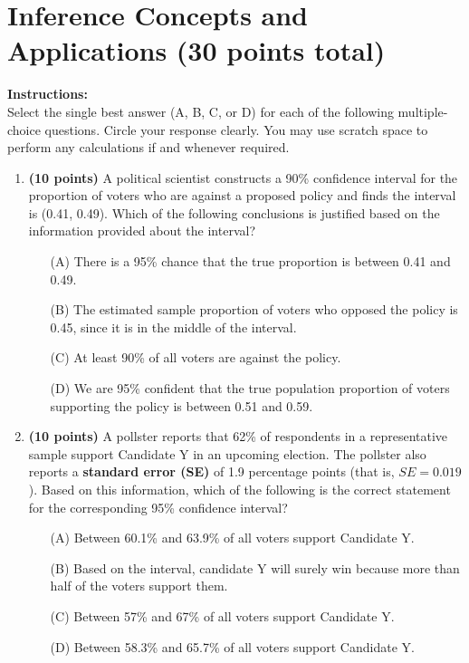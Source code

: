 \documentclass{article}
\newcommand{\blankbox}[2][3cm]{%
    \vspace{-0.5em}
    \begin{figure}[H]
        \makebox[\linewidth]{%
            \begin{tcolorbox}[
                colback=white,
                colframe=white,  %
                width=#2, %
                height=#1,
                boxrule=0.2mm
            ]
            \end{tcolorbox}
        }
    \end{figure}
    \vspace{-2em}
}
\begin{document}
\newpage
\section{Inference Concepts and Applications (30 points total)}
\noindent\textbf{Instructions:} \\
Select the single best answer (A, B, C, or D) for each of the following multiple-choice questions. Circle your response clearly. You may use scratch space to perform any calculations if and whenever required.

\begin{enumerate}
    \item \textbf{(10 points)}   A political scientist constructs a 90\% confidence interval for the proportion of voters who are against a proposed policy and finds the interval is (0.41, 0.49). Which of the following conclusions is justified based on the information provided about the interval?
    \begin{enumerate}
        \item[(A)] There is a 95\% chance that the true proportion is between 0.41 and 0.49.
        \item[(B)] The estimated sample proportion of voters who opposed the policy is 0.45, since it is in the middle of the interval.
        \item[(C)] At least 90\% of all voters are against the policy.
        \item[(D)]  We are 95\% confident that the true population proportion of voters supporting the policy is between 0.51 and 0.59.
    \end{enumerate} \blankbox[2cm]{1.0\linewidth}


    \item \textbf{(10 points)} A pollster reports that 62\% of respondents in a representative sample support Candidate Y in an upcoming election. The pollster also reports a \textbf{standard error (SE)} of 1.9 percentage points (that is, $SE=0.019$). Based on this information, which of the following is the correct statement for the corresponding 95\% confidence interval?

    \begin{enumerate}
        \item[(A)] Between 60.1\% and 63.9\% of all voters support Candidate Y.
        \item[(B)] Based on the interval, candidate Y will surely win because more than half of the voters support them.
        \item[(C)] Between 57\% and 67\% of all voters support Candidate Y.
        \item[(D)] Between 58.3\% and 65.7\% of all voters support Candidate Y.
    \end{enumerate}
    \blankbox[2cm]{1.0\linewidth}


\end{enumerate}
\end{document}
